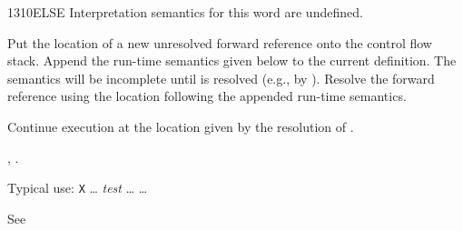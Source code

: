 \begin{worddef}{1310}{ELSE}
\interpret
	Interpretation semantics for this word are undefined.

\compile

	Put the location of a new unresolved forward reference
	 onto the control flow stack. Append the run-time
	semantics given below to the current definition. The semantics
	will be incomplete until  is resolved (e.g., by
	). Resolve the forward reference  using
	the location following the appended run-time semantics.

\runtime
	\stack{}{}

	Continue execution at the location given by the resolution of
	.

\see {},
	.

	\begin{defer}
	\rationale %
		Typical use:
			\word{:} \texttt{X} {\ldots}
				\emph{test}  {\ldots}
				 {\ldots} 
			\word{;}

	\testing*
		See 
	\end{defer}
\end{worddef}


